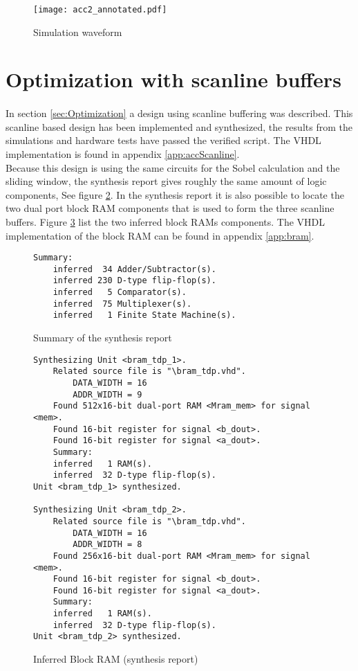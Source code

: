 \begin{figure}[H]
	\centering
    \texttt{[image: acc2\_annotated.pdf]}
	\caption{Simulation waveform}
	\label{fig:acc2_waveform}
\end{figure}


\section{Optimization with scanline buffers}
\paragraph*{}
In section \ref{sec:Optimization} a design using scanline buffering was described. This scanline based design has been implemented and synthesized, the results from the simulations and hardware tests have passed the verified script. The VHDL implementation is found in appendix \ref{app:accScanline}. \\
Because this design is using the same circuits for the Sobel calculation and the sliding window, the synthesis report gives roughly the same amount of logic components, See figure \ref{fig:sum_synthesis_report_scan}.
In the synthesis report it is also possible to locate the two dual port block RAM components that is used to form the three scanline buffers. Figure \ref{fig:sum_synthesis_report_ram} list the two inferred block RAMs components. The VHDL implementation of the block RAM can be found in appendix \ref{app:bram}.
    
\begin{figure}[H]
\centering
\small
\begin{BVerbatim}
Summary:
    inferred  34 Adder/Subtractor(s).
    inferred 230 D-type flip-flop(s).
    inferred   5 Comparator(s).
    inferred  75 Multiplexer(s).
    inferred   1 Finite State Machine(s).
\end{BVerbatim}
\caption{Summary of the synthesis report}
\label{fig:sum_synthesis_report_scan}
\end{figure}

\begin{figure}[H]
\centering
\small
\begin{BVerbatim}
Synthesizing Unit <bram_tdp_1>.
    Related source file is "\bram_tdp.vhd".
        DATA_WIDTH = 16
        ADDR_WIDTH = 9
    Found 512x16-bit dual-port RAM <Mram_mem> for signal <mem>.
    Found 16-bit register for signal <b_dout>.
    Found 16-bit register for signal <a_dout>.
    Summary:
	inferred   1 RAM(s).
	inferred  32 D-type flip-flop(s).
Unit <bram_tdp_1> synthesized.

Synthesizing Unit <bram_tdp_2>.
    Related source file is "\bram_tdp.vhd".
        DATA_WIDTH = 16
        ADDR_WIDTH = 8
    Found 256x16-bit dual-port RAM <Mram_mem> for signal <mem>.
    Found 16-bit register for signal <b_dout>.
    Found 16-bit register for signal <a_dout>.
    Summary:
	inferred   1 RAM(s).
	inferred  32 D-type flip-flop(s).
Unit <bram_tdp_2> synthesized.
\end{BVerbatim}
\caption{Inferred Block RAM (synthesis report)}
\label{fig:sum_synthesis_report_ram}
\end{figure}

